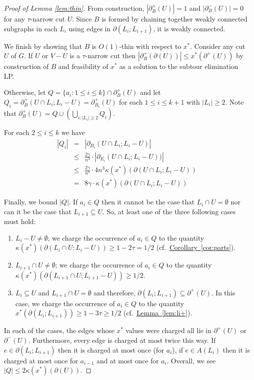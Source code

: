 \documentclass[11pt]{article}
\newcommand{\lref}[2][]{\hyperref[#2]{#1~\ref*{#2}}}
\theoremstyle{definition}
\def\A{{B}}
\begin{document}
\begin{proof}[Proof of Lemma \ref{lem:thin}]
From construction, $|\partial^+_{\A}(U)| = 1$ and $|\partial^-_{\A}(U)| = 0$ for any $\tau$-narrow cut $U$.
Since $\A$ is formed by chaining together weakly connected subgraphs in each $L_i$ using edges in $\partial(L_i;L_{i+1})$, it is weakly connected.

We finish by showing that $\A$ is $O(1)$-thin with respect to $x^*$. Consider any cut $U$ of $G$.
If $U$ or $V-U$ is a $\tau$-narrow cut then $|\partial_\A^+(\partial(U))| \leq x^*(\partial^+(U))$ by construction of $\A$ and feasibility of $x^*$ as a solution to the subtour elimination LP.

Otherwise, let $Q = \{a_i : 1 \leq i \leq k\} \cap \partial_\A^+(U)$ and let $Q_i = \partial^+_\A(U \cap L_i ; L_i - U) = \partial^+_{\A_i}(U)$ for each $1 \leq i \leq k+1$ with $|L_i| \geq 2$.
Note that $\partial_\A^+(U) = Q \cup \left(\bigcup_{i : |L_i| \geq 2} Q_i\right)$.

For each $2 \leq i \leq k$ we have
\begin{eqnarray*}
|Q_i| & = & |\partial_{\A_i}(U \cap L_i;L_i-U)| \\
& \leq & \frac{2\gamma}{n^3} \cdot |\partial_{E_i}(U \cap L_i;L_i-U))| \\
& \leq & \frac{2\gamma}{n^3} \cdot 4n^3 \kappa(x^*)(\partial(U \cap L_i;L_i-U)) \\
& = & 8 \gamma \cdot \kappa(x^*)(\partial(U \cap L_i;L_i-U))
\end{eqnarray*}

Finally, we bound $|Q|$. If $a_i \in Q$ then it cannot be the case that $L_i \cap U = \emptyset$ nor can it be the case that $L_{i+1} \subseteq U$.
So, at least one of the three following cases must hold:
\begin{enumerate}
\item $L_i-U \neq \emptyset$; we charge the occurrence of $a_i \in Q$ to the quantity $\kappa(x^*)(\partial(L_i \cap U; L_i - U)) \geq 1-2\tau = 1/2$
(cf.\ \lref[Corollary]{cor:parts}).
\item $L_{i+1} \cap U \neq \emptyset$; we charge the occurrence of $a_i \in Q$ to the quantity $\kappa(x^*)(\partial(L_{i+1} \cap U; L_{i+1} - U)) \geq 1/2$.
\item $L_i\subseteq U$ and $L_{i+1}\cap U=\emptyset$ and therefore, $\partial(L_i;L_{i+1}) \subseteq \partial^+(U)$. In this case, we charge the occurrence of $a_i \in Q$ to the quantity $x^*(\partial(L_i; L_{i+1})) \geq 1-3\tau \geq 1/2$
(cf.\ \lref[Lemma]{lem:li+}).
\end{enumerate}
In each of the cases, the edges whose $x^*$ values were charged all lie in $\partial^+(U)$ or $\partial^-(U)$. Furthermore, every edge is charged at most twice
this way. If $e \in \partial(L_i; L_{i+1})$ then it is charged at most once (for $a_i$), if $e \in A(L_i)$ then it is charged at most once for $a_{i-1}$ and at most
once for $a_i$. Overall, we see $|Q| \leq 2\kappa(x^*)(\partial(U))$.


\end{proof}
\end{document}
